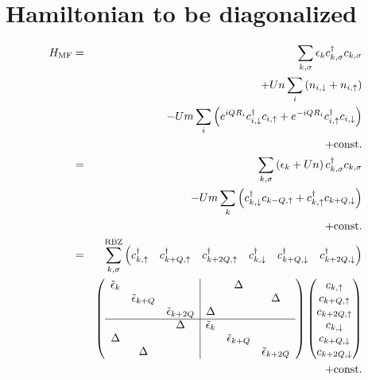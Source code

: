 \documentclass[a4paper,11pt]{article}
\begin{document}
\section{Hamiltonian to be diagonalized}

\begin{eqnarray}
 H_{\mathrm{MF}} &=&
  \sum_{k,\sigma} \epsilon_{k} c_{k,\sigma}^{\dagger} c_{k,\sigma}
\nonumber
\\
 && + Un \sum_{i} \left(
   n_{i,\downarrow}
   + n_{i,\uparrow}
  \right)
\nonumber
\\
 && - Um \sum_{i} \left(
   e^{iQR_i} c_{i,\downarrow}^{\dagger}c_{i,\uparrow}
   + e^{-iQR_i} c_{i,\uparrow}^{\dagger}c_{i,\downarrow}
  \right)
\nonumber
\\
 && + \mathrm{const.}
\nonumber
\\
 &=& \sum_{k,\sigma} \left( \epsilon_{k} + Un \right) c_{k,\sigma}^{\dagger} c_{k,\sigma}
\nonumber
\\
 && - Um \sum_{k} \left(
   c_{k,\downarrow}^{\dagger}c_{k-Q,\uparrow}
   + c_{k,\uparrow}^{\dagger}c_{k+Q,\downarrow}
  \right)
\nonumber
\\
 && + \mathrm{const.}
\nonumber
\\
 &=&
  \sum_{k,\sigma}^{\mathrm{RBZ}}
  \begin{pmatrix}
   c_{k,\uparrow}^{\dagger} &
   c_{k+Q,\uparrow}^{\dagger} &
   c_{k+2Q,\uparrow}^{\dagger} &
   c_{k,\downarrow}^{\dagger} &
   c_{k+Q,\downarrow}^{\dagger} &
   c_{k+2Q,\downarrow}^{\dagger}
  \end{pmatrix}
 \nonumber
\\
 &&
  \left(
  \begin{array}{*3{c}|*3{c}}
   \tilde\epsilon_{k} & & & & \Delta & \\
   & \tilde\epsilon_{k+Q} & & & & \Delta \\
   & & \tilde\epsilon_{k+2Q} & \Delta & & \\
   \cline{1-6}
   & & \Delta & \tilde\epsilon_{k} & & \\
   \Delta & & & & \tilde\epsilon_{k+Q} & \\
   & \Delta & & & & \tilde\epsilon_{k+2Q} \\
  \end{array}
  \right)
  \begin{pmatrix}
   c_{k,\uparrow} \\
   c_{k+Q,\uparrow} \\
   c_{k+2Q,\uparrow} \\
   c_{k,\downarrow} \\
   c_{k+Q,\downarrow} \\
   c_{k+2Q,\downarrow}
  \end{pmatrix}
\nonumber
\\
 && + \mathrm{const.}
\end{eqnarray}
\end{document}
